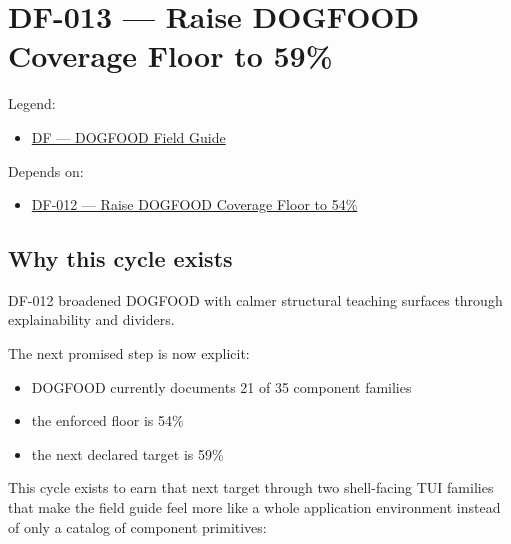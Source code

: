 \chapter{DF-013 --- Raise DOGFOOD Coverage Floor to 59\%}\label{record-075}

\smallskip

Legend:

\begin{itemize}
\tightlist
\item
  \href{https://github.com/flyingrobots/bijou/blob/1853ad902f6bf219326409e7f743a5a1d6517dbc/docs/legends/DF-dogfood-field-guide.md}{DF --- DOGFOOD Field Guide}
\end{itemize}

Depends on:

\begin{itemize}
\tightlist
\item
  \href{https://github.com/flyingrobots/bijou/blob/cbd70612140e7a450d764b3c7be1c6af878b99bc/docs/design/DF-012-raise-dogfood-coverage-floor-to-54-percent.md}{DF-012 --- Raise DOGFOOD Coverage Floor to 54\%}
\end{itemize}

\section{Why this cycle exists}\label{record-075-why-this-cycle-exists}

DF-012 broadened DOGFOOD with calmer structural teaching surfaces through explainability and dividers.

The next promised step is now explicit:

\begin{itemize}
\tightlist
\item
  DOGFOOD currently documents 21 of 35 component families
\item
  the enforced floor is 54\%
\item
  the next declared target is 59\%
\end{itemize}

This cycle exists to earn that next target through two shell-facing TUI families that make the field guide feel more like a whole application environment instead of only a catalog of component primitives:

